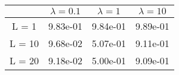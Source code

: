 \begin{tabular}{cccc}
& $\lambda = 0.1$ & $\lambda = 1$ & $\lambda = 10$ \\
\hline
L = 1 & 9.83e-01 & 9.84e-01 & 9.89e-01 \\
L = 10 & 9.68e-02 & 5.07e-01 & 9.11e-01 \\
L = 20 & 9.18e-02 & 5.00e-01 & 9.09e-01 \\
\hline
\end{tabular}
